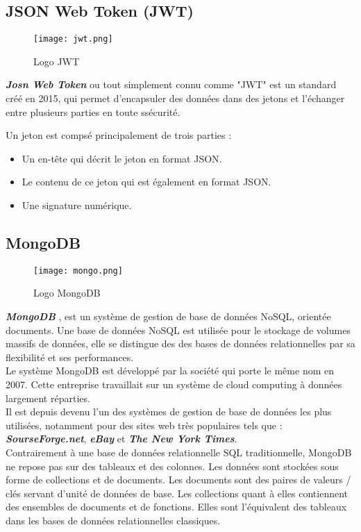 \subsection{JSON Web Token (JWT)}
\begin{figure}[H]
    \centering
    \texttt{[image: jwt.png]}
    \vspace{1cm}
    \captionsetup{justification=centering}
    \caption{Logo JWT}
    \label{fig:jwt_logo}
\end{figure}
\textbf{\textit{Josn Web Token}} ou tout simplement connu comme "JWT" est un standard créé en 2015, qui permet d'encapsuler des données dans des jetons et l'échanger entre plusieurs parties en toute ssécurité.

Un jeton est compsé principalement de trois parties :
\begin{itemize}
    \item Un en-tête qui décrit le jeton en format JSON.
    \item Le contenu de ce jeton qui est également en format JSON.
    \item Une signature numérique.
\end{itemize}
\subsection{MongoDB}
\vspace{1cm}
\begin{figure}[H]
    \centering
    \texttt{[image: mongo.png]}
    \vspace{1cm}
    \captionsetup{justification=centering}

    \caption{Logo MongoDB}
    \label{fig:mongo_logo}
\end{figure}
\textit{\textbf{MongoDB}} \cite{mongodb} , est un système de gestion de base de données NoSQL, orientée documents. Une base de données NoSQL est utilisée pour le stockage de volumes massifs de données, elle se distingue des des bases de données relationnelles par sa flexibilité et ses performances.\\
\noindent Le système MongoDB est développé par la société qui porte le même nom en 2007. Cette entreprise travaillait sur un système de cloud computing à données largement réparties.\\
\noindent Il est depuis devenu l'un des systèmes de gestion de base de données les plus utilisées, notamment pour des sites web très populaires tels que : \textit{\textbf{SourseForge.net}}, \textit{\textbf{eBay}} et \textit{\textbf{The New York Times}}.\\
\noindent Contrairement à une base de données relationnelle SQL traditionnelle, MongoDB ne repose pas sur des tableaux et des colonnes. Les données sont stockées sous forme de collections et de documents.
Les documents sont des paires de valeurs / clés servant d'unité de données de base. Les collections quant à elles contiennent des ensembles de documents et de fonctions. Elles sont l'équivalent des tableaux dans les bases de données relationnelles classiques.
